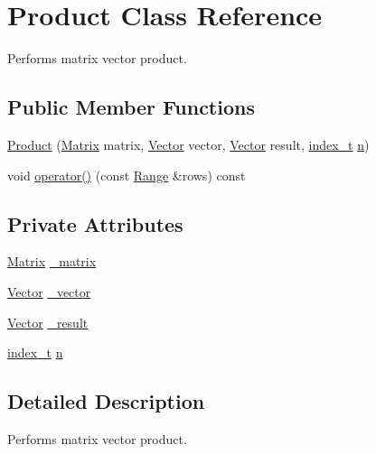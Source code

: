 \hypertarget{class_product}{
\section{Product Class Reference}
\label{class_product}
}
Performs matrix vector product.  


\subsection*{Public Member Functions}
\begin{CompactItemize}
\item 
\hyperlink{class_product_516ecf8496b6684c7288dc0d6b002965}{Product} (\hyperlink{cowichan_8hpp_3fb46f939e55c239fbc95656fc0f3399}{Matrix} matrix, \hyperlink{cowichan_8hpp_02bc1553e241b9b33408482658b3c355}{Vector} vector, \hyperlink{cowichan_8hpp_02bc1553e241b9b33408482658b3c355}{Vector} result, \hyperlink{cowichan_8hpp_5b04577d5d21124855deaad298595371}{index\_\-t} \hyperlink{class_product_7216f072885841c00e8e4aa3372ea277}{n})
\item 
void \hyperlink{class_product_a88c9ebd1997feb3dbd98086d5dd7cff}{operator()} (const \hyperlink{cowichan__tbb_8hpp_8e2057f725b08f3a15513c378a453a47}{Range} \&rows) const 
\end{CompactItemize}
\subsection*{Private Attributes}
\begin{CompactItemize}
\item 
\hyperlink{cowichan_8hpp_3fb46f939e55c239fbc95656fc0f3399}{Matrix} \hyperlink{class_product_63011ee94f2a8c0aa49468c1a8029478}{\_\-matrix}
\item 
\hyperlink{cowichan_8hpp_02bc1553e241b9b33408482658b3c355}{Vector} \hyperlink{class_product_40c40247c21e89bce81a64001c52caab}{\_\-vector}
\item 
\hyperlink{cowichan_8hpp_02bc1553e241b9b33408482658b3c355}{Vector} \hyperlink{class_product_81890b0d05e574d9dc8dae60a9815e32}{\_\-result}
\item 
\hyperlink{cowichan_8hpp_5b04577d5d21124855deaad298595371}{index\_\-t} \hyperlink{class_product_7216f072885841c00e8e4aa3372ea277}{n}
\end{CompactItemize}


\subsection{Detailed Description}
Performs matrix vector product. 

